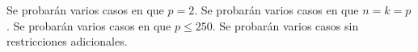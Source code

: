 \documentclass{oci}
\begin{document}
\begin{scoreDescription}
  	Se probarán varios casos en que $p = 2$.
 	Se probarán varios casos en que $n = k = p$.
  	Se probarán varios casos en que $p \leq 250$.
	Se probarán varios casos sin restricciones adicionales.
\end{scoreDescription}

\begin{sampleDescription}
\end{sampleDescription}
\end{document}
